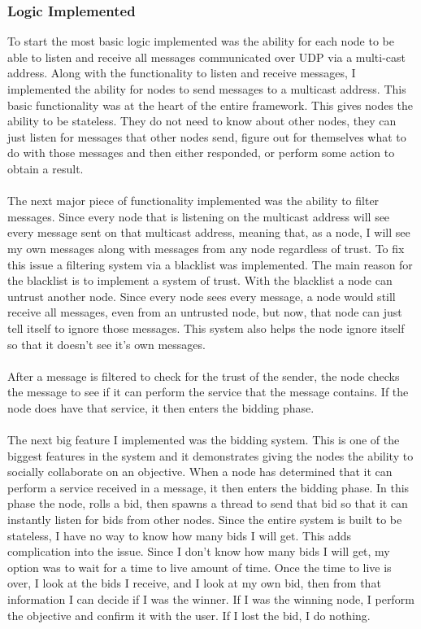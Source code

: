 \documentclass[draftclsnofoot, onecolumn, compsoc, 10pt]{IEEEtran}
\begin{document}
\subsubsection{Logic Implemented}
To start the most basic logic implemented was the ability for each node to be able to listen and receive all messages communicated over UDP via a multi-cast address. Along with the functionality to listen and receive messages, I implemented the ability for nodes to send messages to a multicast address. This basic functionality was at the heart of the entire framework. This gives nodes the ability to be stateless. They do not need to know about other nodes, they can just listen for messages that other nodes send, figure out for themselves what to do with those messages and then either responded, or perform some action to obtain a result.
\\ \\
The next major piece of functionality implemented was the ability to filter messages. Since every node that is listening on the multicast address will see every message sent on that multicast address, meaning that, as a node, I will see my own messages along with messages from any node regardless of trust. To fix this issue a filtering system via a blacklist was implemented. The main reason for the blacklist is to implement a system of trust. With the blacklist a node can untrust another node. Since every node sees every message, a node would still receive all messages, even from an untrusted node, but now, that node can just tell itself to ignore those messages. This system also helps the node ignore itself so that it doesn't see it's own messages.
\\ \\
After a message is filtered to check for the trust of the sender, the node checks the message to see if it can perform the service that the message contains. If the node does have that service, it then enters the bidding phase.
\\ \\
The next big feature I implemented was the bidding system. This is one of the biggest features in the system and it demonstrates giving the nodes the ability to socially collaborate on an objective. When a node has determined that it can perform a service received in a message, it then enters the bidding phase. In this phase the node, rolls a bid, then spawns a thread to send that bid so that it can instantly listen for bids from other nodes. Since the entire system is built to be stateless, I have no way to know how many bids I will get. This adds complication into the issue. Since I don't know how many bids I will get, my option was to wait for a time to live amount of time. Once the time to live is over, I look at the bids I receive, and I look at my own bid, then from that information I can decide if I was the winner. If I was the winning node, I perform the objective and confirm it with the user. If I lost the bid, I do nothing.
\end{document}
